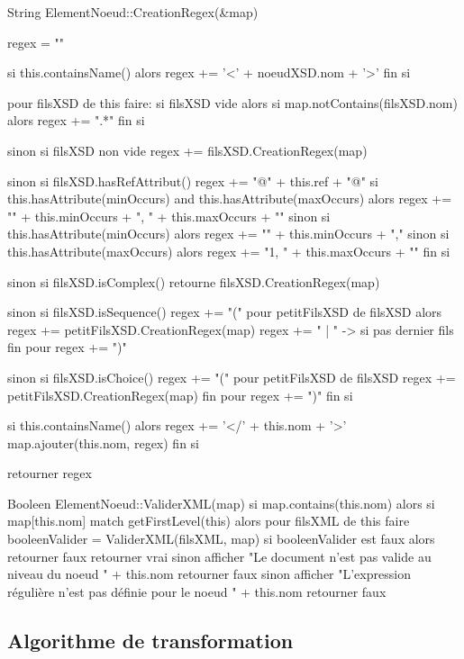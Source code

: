 \begin{verbatimtab}
String ElementNoeud::CreationRegex(&map) {
    regex = ""

    si this.containsName() alors
        regex += '<' + noeudXSD.nom + '>'
    fin si

    pour filsXSD de this faire:
        si filsXSD vide alors
			si map.notContains(filsXSD.nom) alors
    			regex += ".*"
            fin si

		sinon si filsXSD non vide
			regex += filsXSD.CreationRegex(map)

		sinon si filsXSD.hasRefAttribut()
			regex += "@" + this.ref + "@"
			si this.hasAttribute(minOccurs) and this.hasAttribute(maxOccurs) alors
   				 regex += "{" + this.minOccurs + ", " + this.maxOccurs + "}"
			sinon si this.hasAttribute(minOccurs) alors
    			regex += "{" + this.minOccurs + ",}"
			sinon si this.hasAttribute(maxOccurs) alors
    			regex += "{1, " + this.maxOccurs + "}"
            fin si
 
		sinon si filsXSD.isComplex()
        	retourne filsXSD.CreationRegex(map)
         

		sinon si filsXSD.isSequence()
		regex += "("
		pour petitFilsXSD de filsXSD alors
    		regex += petitFilsXSD.CreationRegex(map)
   		 	regex += " | " -> si pas dernier fils
        fin pour
		regex += ")"

		sinon si filsXSD.isChoice()
			regex += "("
			pour petitFilsXSD de filsXSD 
    			regex += petitFilsXSD.CreationRegex(map)
            fin pour
			regex += ")"
        fin si

    si this.containsName() alors
        regex += '</' + this.nom + '>'
        map.ajouter(this.nom, regex)
    fin si
    
    retourner regex
}

\end{verbatimtab}

\begin{verbatimtab}
Booleen ElementNoeud::ValiderXML(map)
    si map.contains(this.nom) alors
        si map[this.nom] match getFirstLevel(this) alors
            pour filsXML de this faire
                booleenValider = ValiderXML(filsXML, map)
                si booleenValider est faux alors
                    retourner faux 
            retourner vrai
        sinon
            afficher "Le document n'est pas valide au niveau du noeud " + this.nom
            retourner faux
    sinon
        afficher "L'expression régulière n'est pas définie pour le noeud " + this.nom
        retourner faux
\end{verbatimtab}

\subsection{Algorithme de transformation}